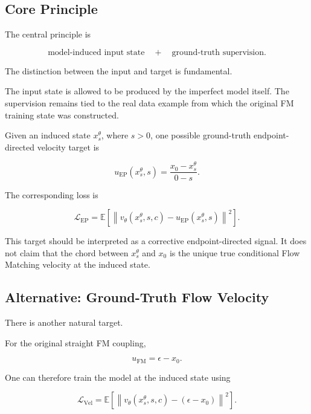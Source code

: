 \documentclass[11pt]{article}
\begin{document}
\subsection{Core Principle}

The central principle is

\begin{equation}
\boxed{
\text{model-induced input state}
\quad+\quad
\text{ground-truth supervision}.
}
\end{equation}

The distinction between the input and target is fundamental.

The input state is allowed to be produced by the imperfect model itself. The
supervision remains tied to the real data example from which the original FM
training state was constructed.

Given an induced state $x_s^\theta$, where $s>0$, one possible ground-truth
endpoint-directed velocity target is

\begin{equation}
\boxed{
u_{\mathrm{EP}}
(x_s^\theta,s)
=
\frac{x_0-x_s^\theta}{0-s}.
}
\end{equation}

The corresponding loss is

\begin{equation}
\mathcal{L}_{\mathrm{EP}}
=
\mathbb{E}
\left[
\left\|
v_\theta(x_s^\theta,s,c)
-
u_{\mathrm{EP}}(x_s^\theta,s)
\right\|^2
\right].
\end{equation}

This target should be interpreted as a corrective endpoint-directed signal.
It does not claim that the chord between $x_s^\theta$ and $x_0$ is the unique
true conditional Flow Matching velocity at the induced state.

\subsection{Alternative: Ground-Truth Flow Velocity}

There is another natural target.

For the original straight FM coupling,

\begin{equation}
u_{\mathrm{FM}}
=
\epsilon-x_0.
\end{equation}

One can therefore train the model at the induced state using

\begin{equation}
\mathcal{L}_{\mathrm{Vel}}
=
\mathbb{E}
\left[
\left\|
v_\theta(x_s^\theta,s,c)
-
(\epsilon-x_0)
\right\|^2
\right].
\end{equation}
\end{document}
